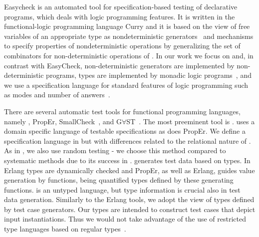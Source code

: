 {\sf Easycheck} is an automated tool for specification-based testing of
declarative programs, which deals with logic programming features.
%
It is written in the functional-logic programming language Curry and it
is based on the view of free variables of an appropriate type as
nondeterministic generators~\cite{antoy2006overlapping} and mechanisms
to specify  properties of
nondeterministic operations by generalizing the set of combinators for
non-deterministic operations of \QuickCheck{}.
%
In our work we focus on \Prolog{} and, in contrast with {\sf EasyCheck}, non-deterministic generators are implemented by non-deterministic \Prolog{}
programs, types are implemented by monadic logic programs~\cite{fruhwirth1991logic,florido1992types}, and
we use a specification language for standard features of
logic programming such as modes and number of
answers~\cite{Deville1990logprog}.
%


There are several automatic test tools for functional programming
languages, namely \QuickCheck, {\sf PropEr}, {\sf SmallCheck}~\cite{runciman2008smallcheck},
and G$\forall$ST~\cite{koopman2003gast}.
The %
most preeminent tool is \QuickCheck{}.
%
\QuickCheck{} uses a domain specific language of testable specifications
as does {\sf PropEr}.
%
We define a specification language in \plqc{} but with
differences related to the relational nature of \Prolog{}. %
As in \QuickCheck{}, we also use random testing - we choose this method
compared to systematic methods due to its success in \QuickCheck{}.
%
\QuickCheck{} generates test data %
based
on \Haskell{} types.
In {\sf Erlang} types are dynamically checked and {\sf PropEr}, as well
as {\sf Erlang}\QuickCheck{}, guides value generation by functions,
being quantified types defined by these generating functions.
%
\Prolog{} is an untyped language, but type information is crucial also in
\plqc{} test data generation.
%
Similarly to the {\sf Erlang} tools, we adopt the view of types defined
by test case generators.
%
Our types are intended to construct test cases that depict input
instantiations.
%
Thus we would not take advantage of the use of restricted type languages
based on regular types~\cite{Yardeni:1991:TSL:110703.110705,fruhwirth1991logic,DBLP:conf/iclp/Zobel87,florido1992types}.


